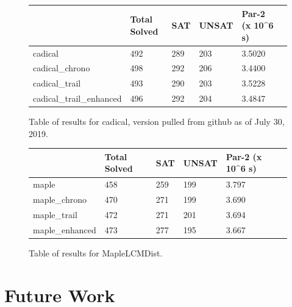\documentclass[runningheads]{llncs}
\begin{document}
\begin{figure}
    \begin{tabular}{|l|l|l|l|l|l|}
      \hline
      & Total Solved & SAT & UNSAT & Par-2 (x 10\textasciicircum{}6 s) \\ \hline
      cadical                  & 492          & 289 &  203  & 3.5020                            \\ \hline
      cadical\_chrono          & 498          & 292 &  206  & 3.4400                            \\ \hline
      cadical\_trail           & 493          & 290 &  203  & 3.5228                            \\ \hline
      cadical\_trail\_enhanced & 496          & 292 &  204  & 3.4847                            \\ \hline
    \end{tabular}
    \caption{Table of results for cadical, version pulled from github as of July 30, 2019.}
\end{figure}

\begin{figure}
    \begin{tabular}{|l|l|l|l|l|l|}
      \hline
      & Total Solved & SAT & UNSAT & Par-2 (x 10\textasciicircum{}6 s) \\ \hline
      maple           & 458          & 259 &  199  & 3.797                             \\ \hline
      maple\_chrono   & 470          & 271 &  199  & 3.690                             \\ \hline
      maple\_trail    & 472          & 271 &  201  & 3.694                             \\ \hline
      maple\_enhanced & 473          & 277 &  195  & 3.667                             \\ \hline
    \end{tabular}
    \caption{Table of results for MapleLCMDist.}
\end{figure}
\clearpage

\section{Future Work}
\end{document}
